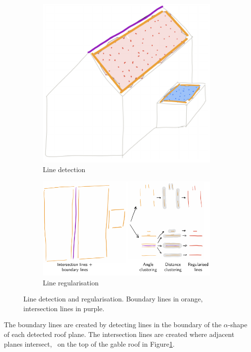 \begin{figure}
	\centering
	\begin{subfigure}[b]{0.3\linewidth}
		\includegraphics[width=\linewidth]{figs/shapedetection.pdf}
		\caption{Line detection}%
		\label{subfig:shapedetection}
	\end{subfigure}
	\quad
	\begin{subfigure}[b]{0.58\linewidth}
		\includegraphics[width=\linewidth]{figs/regularisation.pdf}
		\caption{Line regularisation}%
		\label{subfig:regularisation}
	\end{subfigure}
	\caption{Line detection and regularisation. Boundary lines in orange, intersection lines in purple.}%
	\label{fig:lines}
\end{figure}
The boundary lines are created by detecting lines in the boundary of the $\alpha$-shape of each detected roof plane.
The intersection lines are created where adjacent planes intersect, \eg\ on the top of the gable roof in Figure\ref{subfig:shapedetection}.

